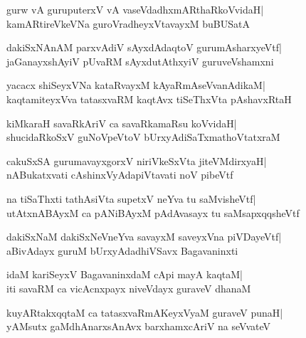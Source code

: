\documentclass[twoside,12pt,openright]{book}
\newcounter{shloka}[chapter]
\begin{document}
\begin{shloka}%
gurw vA guruputerxV vA vaseVdadhxmARthaRkoVvidaH|\\
kamARtireVkeVNa guroVradheyxVtavayxM buBUSatA
\end{shloka}

\begin{shloka}%
dakiSxNAnAM parxvAdiV sAyxdAdaqtoV gurumAsharxyeVtf|\\
jaGanayxshAyiV pUvaRM sAyxdutAthxyiV guruveVshamxni
\end{shloka}

\begin{shloka}%
yacacx shiSeyxVNa kataRvayxM kAyaRmAseVvanAdikaM|\\
kaqtamiteyxVva tatasxvaRM kaqtAvx tiSeThxVta pAshavxRtaH
\end{shloka}

\begin{shloka}%
kiMkaraH savaRkAriV ca savaRkamaRsu koVvidaH|\\
shucidaRkoSxV guNoVpeVtoV bUrxyAdiSaTxmathoVtatxraM
\end{shloka}

\begin{shloka}%
cakuSxSA gurumavayxgorxV niriVkeSxVta jiteVMdirxyaH|\\
nABukatxvati cAshinxVyAdapiVtavati noV pibeVtf
\end{shloka}

\begin{shloka}%
na tiSaThxti tathAsiVta supetxV neYva tu saMvisheVtf|\\
utAtxnABAyxM ca pANiBAyxM pAdAvasayx tu saMsapxqqsheVtf
\end{shloka}

\begin{shloka}%
dakiSxNaM dakiSxNeVneYva savayxM saveyxVna piVDayeVtf|\\
aBivAdayx guruM bUrxyAdadhiVSavx Bagavaninxti
\end{shloka}

\begin{shloka}%
idaM kariSeyxV BagavaninxdaM cApi mayA kaqtaM|\\
iti savaRM ca vicAcnxpayx niveVdayx guraveV dhanaM
\end{shloka}

\begin{shloka}%
kuyARtakxqqtaM ca tatasxvaRmAKeyxVyaM guraveV punaH|\\
yAMsutx gaMdhAnarxsAnAvx barxhamxcAriV na seVvateV
\end{shloka}
\end{document}
